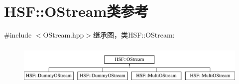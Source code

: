 \hypertarget{classHSF_1_1OStream}{
\section{HSF::OStream类参考}
\label{classHSF_1_1OStream}
}


{\ttfamily \#include $<$OStream.hpp$>$}继承图，类HSF::OStream:\begin{figure}[H]
\begin{center}
\leavevmode
\includegraphics[height=1.98582cm]{classHSF_1_1OStream}
\end{center}
\end{figure}

